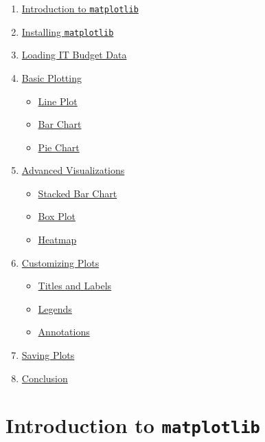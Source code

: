 \documentclass[
  letterpaper,
  DIV=11,
  numbers=noendperiod]{scrreprt}
\providecommand{\tightlist}{%
  \setlength{\itemsep}{0pt}\setlength{\parskip}{0pt}}\usepackage{longtable,booktabs,array}
\begin{document}
\begin{enumerate}
\def\labelenumi{\arabic{enumi}.}
\tightlist
\item
  \hyperref[introduction-to-matplotlib]{Introduction to
  \texttt{matplotlib}}
\item
  \hyperref[installing-matplotlib]{Installing \texttt{matplotlib}}
\item
  \hyperref[loading-it-budget-data]{Loading IT Budget Data}
\item
  \hyperref[basic-plotting]{Basic Plotting}

  \begin{itemize}
  \tightlist
  \item
    \hyperref[line-plot]{Line Plot}
  \item
    \hyperref[bar-chart]{Bar Chart}
  \item
    \hyperref[pie-chart]{Pie Chart}
  \end{itemize}
\item
  \hyperref[advanced-visualizations]{Advanced Visualizations}

  \begin{itemize}
  \tightlist
  \item
    \hyperref[stacked-bar-chart]{Stacked Bar Chart}
  \item
    \hyperref[box-plot]{Box Plot}
  \item
    \hyperref[heatmap]{Heatmap}
  \end{itemize}
\item
  \hyperref[customizing-plots]{Customizing Plots}

  \begin{itemize}
  \tightlist
  \item
    \hyperref[titles-and-labels]{Titles and Labels}
  \item
    \hyperref[legends]{Legends}
  \item
    \hyperref[annotations]{Annotations}
  \end{itemize}
\item
  \hyperref[saving-plots]{Saving Plots}
\item
  \hyperref[conclusion]{Conclusion}
\end{enumerate}

\section{\texorpdfstring{Introduction to
\texttt{matplotlib}}{Introduction to matplotlib}}\label{introduction-to-matplotlib}
\end{document}
